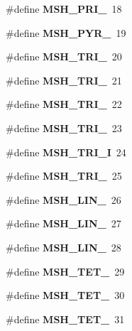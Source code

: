 \begin{DoxyCompactItemize}
\item 
\#define {\bfseries M\-S\-H\-\_\-\-P\-R\-I\-\_}~18\label{GmshDefines_8h_a39230be763d91b8e7d7bdb84066845ea}

\item 
\#define {\bfseries M\-S\-H\-\_\-\-P\-Y\-R\-\_}~19\label{GmshDefines_8h_a7945b665d40642728985424f8018a64d}

\item 
\#define {\bfseries M\-S\-H\-\_\-\-T\-R\-I\-\_}~20\label{GmshDefines_8h_a3fb832e9e63e722b41afa8f166be10ff}

\item 
\#define {\bfseries M\-S\-H\-\_\-\-T\-R\-I\-\_}~21\label{GmshDefines_8h_a9fd8eceea10d60b57c13d8f1c9b27cde}

\item 
\#define {\bfseries M\-S\-H\-\_\-\-T\-R\-I\-\_}~22\label{GmshDefines_8h_a857c710a027dc1396e7892351772d40b}

\item 
\#define {\bfseries M\-S\-H\-\_\-\-T\-R\-I\-\_}~23\label{GmshDefines_8h_a3c37155040cdbf6adaa66a77e1412bed}

\item 
\#define {\bfseries M\-S\-H\-\_\-\-T\-R\-I\-\_\-I}~24\label{GmshDefines_8h_a724b2157276d18419e426160a9bbc5ab}

\item 
\#define {\bfseries M\-S\-H\-\_\-\-T\-R\-I\-\_}~25\label{GmshDefines_8h_aee588083f8ccb56a692180febe58c4f6}

\item 
\#define {\bfseries M\-S\-H\-\_\-\-L\-I\-N\-\_}~26\label{GmshDefines_8h_a8387864ed192c960a77a2cc73d4c2909}

\item 
\#define {\bfseries M\-S\-H\-\_\-\-L\-I\-N\-\_}~27\label{GmshDefines_8h_a1477febe0659b0413e7abb252f7a063b}

\item 
\#define {\bfseries M\-S\-H\-\_\-\-L\-I\-N\-\_}~28\label{GmshDefines_8h_a59d3401f9dab67a0e1e59dc0f8898ae9}

\item 
\#define {\bfseries M\-S\-H\-\_\-\-T\-E\-T\-\_}~29\label{GmshDefines_8h_a9e4de4491716bee05c6e9ddd04cdcd88}

\item 
\#define {\bfseries M\-S\-H\-\_\-\-T\-E\-T\-\_}~30\label{GmshDefines_8h_a10f8b0422a08f20fd5faf79cb6675e54}

\item 
\#define {\bfseries M\-S\-H\-\_\-\-T\-E\-T\-\_}~31\label{GmshDefines_8h_a0a234b00bb2e2b4e41d6049ec6a82c82}


\end{DoxyCompactItemize}
